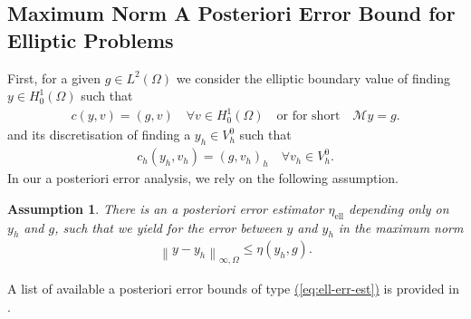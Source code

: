 \documentclass[11pt, a4paper]{article}
\newtheorem{ass}{Assumption}
\renewcommand{\eqref}[1]{\hyperref[#1]{(\ref{#1})}}  %
\newcommand{\scal}[2]{\left(#1,#2\right)}
\newcommand{\mM}{\mathcal{M}}
\newcommand{\norm}[1]{\left\|#1\right\|}
\begin{document}
	\subsection{Maximum Norm A Posteriori Error Bound for Elliptic Problems}
	First, for a given \mbox{$g \in L^2(\Omega)$} we consider the elliptic boundary value of finding \mbox{$y\in H^1_0(\Omega)$} such that
	\begin{gather}\label{eq:ell-val-prob}
		c\scal{y}{v} = \scal{g}{v} \quad \forall v \in H^1_0(\Omega) \quad \text{or for short} \quad \mM y = g.
	\end{gather}
	and its discretisation of finding a \mbox{$y_h \in V^0_h$} such that
	\begin{gather}\label{eq:disc-ell-val-prob}
		c_h\scal{y_h}{v_h} = \scal{g}{v_h}_h \quad \forall v_h \in V^0_h.
	\end{gather}
	In our a posteriori error analysis, we rely on the following assumption.
	\begin{ass}\label{ass:ell-est}
		There is an a posteriori error estimator $\eta_\mathrm{ell}$ depending only on $y_h$ and $g$, such that we yield for the error between $y$ and $y_h$ in the maximum norm
		\begin{gather}\label{eq:ell-err-est}
			\norm{y-y_h}_{\infty, \Omega} \leq \eta(y_h,g).
		\end{gather}  
	\end{ass}
	A list of available a posteriori error bounds of type \eqref{eq:ell-err-est} is provided in \cite{ossadnik2024unified}.
	
\end{document}
